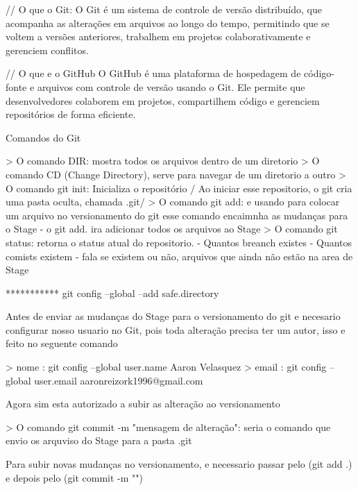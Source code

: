 // O que o Git:
O Git é um sistema de controle de versão distribuído, que acompanha as alterações em arquivos ao longo do tempo, 
permitindo que se voltem a versões anteriores, trabalhem em projetos colaborativamente e gerenciem conflitos.

// O que e o GitHub
O GitHub é uma plataforma de hospedagem de código-fonte e arquivos com controle de versão usando o Git. 
Ele permite que desenvolvedores colaborem em projetos, compartilhem código e gerenciem repositórios de forma eficiente.


Comandos do Git 

> O comando DIR: mostra todos os arquivos dentro de um diretorio
> O comando CD (Change Directory), serve para navegar de um diretorio a outro
> O comando git init: Inicializa o repositório / Ao iniciar esse repositorio, o git
    cria uma pasta oculta, chamada .git/
> O comando git add:  e usando para colocar um arquivo no versionamento do git
    esse comando encaimnha as mudanças para o Stage
    - o git add. ira adicionar todos os arquivos ao Stage 
> O comando git status: retorna o status atual do repositorio. 
    - Quantos breanch existes
    - Quantos comists existem
    - fala se existem ou não, arquivos que ainda não estão na area de Stage

   *********** git config --global --add safe.directory

Antes de enviar as mudanças do Stage para o versionamento do git e necesario configurar nosso
usuario no Git, pois toda alteração precisa ter um autor, isso e feito no seguente comando

> nome : git config --global user.name Aaron Velasquez
> email : git config --global user.email aaronreizork1996@gmail.com

Agora sim esta autorizado a subir as alteração ao versionamento

> O comando git commit -m "mensagem de alteração": seria  o comando que envio os arquviso do Stage para a pasta .git

Para subir novas mudanças no versionamento, e necessario passar pelo (git add .) e depois pelo (git commit -m "")

 